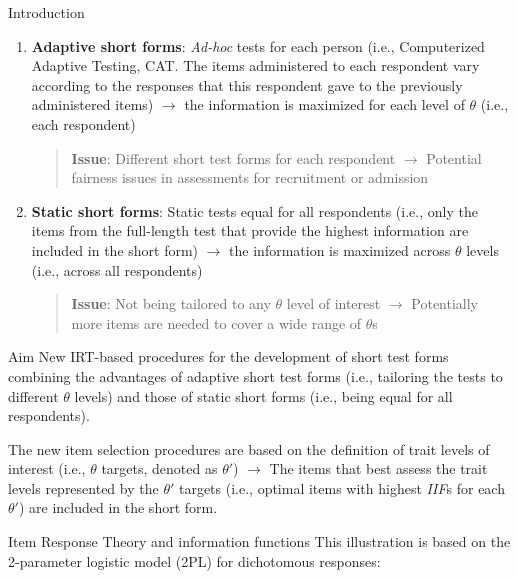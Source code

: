 \documentclass[final,t]{beamer}
\begin{document}
\begin{frame}
\begin{columns}[t]
\begin{column}{.45\linewidth}
\begin{block}{\centering Introduction}
	\begin{enumerate}
		\item \textbf{Adaptive short forms}: \emph{Ad-hoc} tests for each person (i.e., Computerized Adaptive Testing, CAT. The items administered to each respondent vary according to the responses that this respondent gave to the previously administered items) $\rightarrow$ the information is maximized for each level of $\theta$ (i.e., each respondent)
		
		\begin{quote}
			\textbf{Issue}: Different short test forms for each respondent $\rightarrow$ Potential fairness issues in assessments for recruitment or admission
		\end{quote}
		
		\item  \textbf{Static short forms}: Static tests equal for all respondents (i.e., only the items from the full-length test that provide the highest information are included in the short form) $\rightarrow$ the information is maximized across $\theta$ levels (i.e., across all respondents)
		
		\begin{quote}
			\textbf{Issue}: Not being tailored to any $\theta$ level of interest $\rightarrow$ Potentially more items are needed to  cover a wide range of $\theta$s
		\end{quote}
	\end{enumerate}
\end{block}    

\begin{block}{\centering Aim}
	New IRT-based procedures for the development of short test forms combining the advantages of adaptive short test forms (i.e., tailoring the tests to different $\theta$ levels) and  those of static short forms (i.e., being equal for all respondents). 
	
	The new item selection procedures are based on the definition of trait levels of interest (i.e., $\theta$ targets, denoted as $\theta'$) $\rightarrow$  The items that best assess the trait levels represented by the $\theta'$ targets (i.e., optimal items with highest \emph{IIF}s for each $\theta'$) are included in the short form.

\end{block}

\begin{block}{\centering Item Response Theory and information functions}
	This illustration is based on the 2-parameter logistic model (2PL) for dichotomous responses: 
	

\end{block}
\end{column}
\end{columns}
\end{frame}
\end{document}
